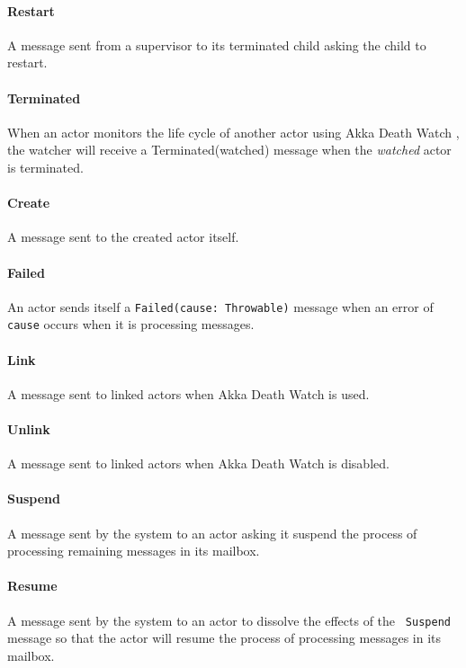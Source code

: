 \paragraph{Restart}A message sent from a supervisor to its terminated child asking the
child to restart.

\paragraph{Terminated}  When an actor monitors the life cycle of another actor using Akka Death 
Watch \citep[Section 3.1]{akka_doc}, the watcher will receive a 
Terminated(watched) message when the {\it watched} actor is terminated.

\paragraph{Create} A message sent to the created actor itself.
  
\paragraph{Failed}  An actor sends itself a {\tt Failed(cause: Throwable)} message when an error 
of {\tt cause} occurs when it is processing messages.
  
\paragraph{Link} A message sent to linked actors when Akka Death Watch \citep[Section 
3.1]{akka_doc} is used.

\paragraph{Unlink}  A message sent to linked actors when Akka Death Watch \citep[Section 
3.1]{akka_doc} is disabled. 

\paragraph{Suspend}   A message sent by the system to an actor asking it suspend the process of 
processing remaining messages in its mailbox.

\paragraph{Resume}  A message sent by the system to an actor to dissolve the effects of the {\tt 
Suspend} message so that the actor will resume the process of processing 
messages in its mailbox.





